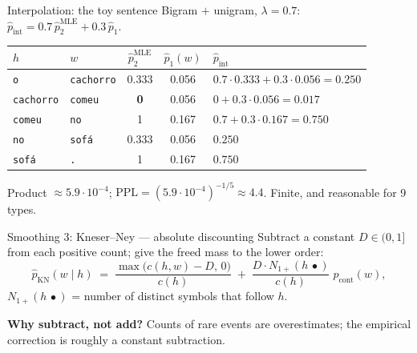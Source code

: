 \documentclass[11pt,aspectratio=169]{beamer}
\newcommand{\PPL}{\mathrm{PPL}}
\newcommand{\dest}[1]{\textcolor{structure}{\textbf{#1}}}
\begin{document}
\begin{frame}{Interpolation: the toy sentence}
  Bigram $+$ unigram, $\lambda = 0.7$:
  $\hat p_{\text{int}} = 0.7\,\hat p_2^{\text{MLE}} + 0.3\,\hat p_1$.

  \vspace{0.6em}
  \begin{center}
  \begin{tabular}{@{}llccl@{}}
    \toprule
    $h$ & $w$ & $\hat p_2^{\text{MLE}}$ & $\hat p_1(w)$ & $\hat p_{\text{int}}$ \\
    \midrule
    \texttt{o} & \texttt{cachorro} & 0.333 & 0.056 & $0.7\cdot 0.333 + 0.3\cdot 0.056 = 0.250$ \\
    \texttt{cachorro} & \texttt{comeu} & \dest{0} & 0.056 & $0 + 0.3\cdot 0.056 = 0.017$ \\
    \texttt{comeu} & \texttt{no} & 1 & 0.167 & $0.7 + 0.3\cdot 0.167 = 0.750$ \\
    \texttt{no} & \texttt{sofá} & 0.333 & 0.056 & $0.250$ \\
    \texttt{sofá} & \texttt{.} & 1 & 0.167 & $0.750$ \\
    \bottomrule
  \end{tabular}
  \end{center}

  \vspace{0.6em}
  Product $\approx 5.9\cdot 10^{-4}$; $\PPL = (5.9\cdot 10^{-4})^{-1/5}\approx 4.4$.
  Finite, and reasonable for 9 types.
\end{frame}

\begin{frame}{Smoothing 3: Kneser--Ney --- absolute discounting}
  Subtract a constant $D\in(0,1]$ from each positive count; give the freed mass to the lower
  order:
  \[
    \hat p_{\text{KN}}(w\mid h) \;=\; \frac{\max\big(c(h,w)-D,\,0\big)}{c(h)}
    \;+\; \frac{D\cdot N_{1+}(h\,\bullet)}{c(h)}\;p_{\text{cont}}(w),
  \]
  $N_{1+}(h\,\bullet)$ = number of distinct symbols that follow $h$.

  \vspace{0.8em}
  \textbf{Why subtract, not add?} Counts of rare events are overestimates; the empirical
  correction is roughly a constant subtraction.
\end{frame}
\end{document}
